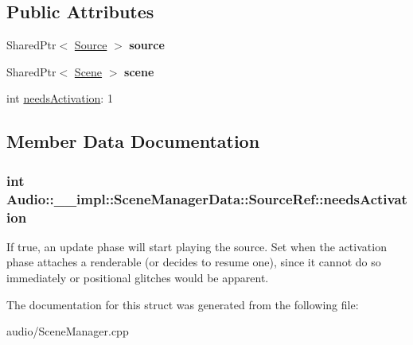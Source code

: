 \subsection*{Public Attributes}
\begin{DoxyCompactItemize}
\item 
Shared\+Ptr$<$ \hyperlink{classAudio_1_1Source}{Source} $>$ {\bfseries source}\hypertarget{structAudio_1_1____impl_1_1SceneManagerData_1_1SourceRef_aed0a12b8e863c06614c8382fc6cc4aa6}{}\label{structAudio_1_1____impl_1_1SceneManagerData_1_1SourceRef_aed0a12b8e863c06614c8382fc6cc4aa6}

\item 
Shared\+Ptr$<$ \hyperlink{classAudio_1_1Scene}{Scene} $>$ {\bfseries scene}\hypertarget{structAudio_1_1____impl_1_1SceneManagerData_1_1SourceRef_a662d89b9a2e2d8268bd48b7d9e513a61}{}\label{structAudio_1_1____impl_1_1SceneManagerData_1_1SourceRef_a662d89b9a2e2d8268bd48b7d9e513a61}

\item 
int \hyperlink{structAudio_1_1____impl_1_1SceneManagerData_1_1SourceRef_a5b6065ab537136c4b993595f869d04aa}{needs\+Activation}\+: 1
\end{DoxyCompactItemize}


\subsection{Member Data Documentation}
\subsubsection[{\texorpdfstring{needs\+Activation}{needsActivation}}]{\setlength{\rightskip}{0pt plus 5cm}int Audio\+::\+\_\+\+\_\+impl\+::\+Scene\+Manager\+Data\+::\+Source\+Ref\+::needs\+Activation\hspace{0.3cm}{\ttfamily [mutable]}}\hypertarget{structAudio_1_1____impl_1_1SceneManagerData_1_1SourceRef_a5b6065ab537136c4b993595f869d04aa}{}\label{structAudio_1_1____impl_1_1SceneManagerData_1_1SourceRef_a5b6065ab537136c4b993595f869d04aa}
If true, an update phase will start playing the source. Set when the activation phase attaches a renderable (or decides to resume one), since it cannot do so immediately or positional glitches would be apparent. 

The documentation for this struct was generated from the following file\+:\begin{DoxyCompactItemize}
\item 
audio/Scene\+Manager.\+cpp\end{DoxyCompactItemize}
